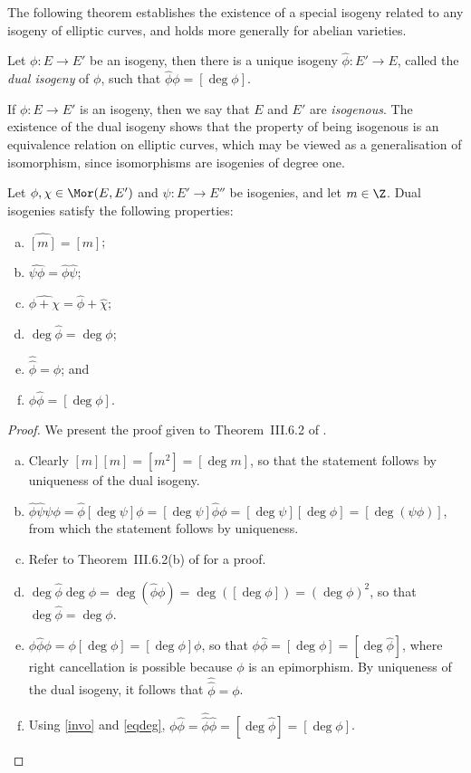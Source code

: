 The following theorem establishes the existence of a special isogeny related to any isogeny of elliptic curves, and holds more generally for abelian varieties.

\begin{thm}{}{}
Let $\phi : E \to E'$ be an isogeny, then there is a unique isogeny $\hat{\phi} : E' \to E$, called the \emph{dual isogeny} of $\phi$, such that $\hat{\phi} \phi = [\deg \phi]$.
\end{thm}

If $\phi : E \to E'$ is an isogeny, then we say that $E$ and $E'$ are \emph{isogenous}. The existence of the dual isogeny shows that the property of being isogenous is an equivalence relation on elliptic curves, which may be viewed as a generalisation of isomorphism, since isomorphisms are isogenies of degree one.

\begin{thm}{}{}
Let $\phi, \chi \in \Mor(E, E')$ and $\psi : E' \to E''$ be isogenies, and let $m \in \Z$. Dual isogenies satisfy the following properties:
\begin{enumerate}[(a)]
\item $\widehat{[m]} = [m]$;
\item $\widehat{\psi \phi} = \hat{\phi} \hat{\psi}$;
\item $\widehat{\phi + \chi} = \hat{\phi} + \hat{\chi}$;
\item \label{eqdeg} $\deg \hat{\phi} = \deg \phi$;
\item \label{invo} $\hat{\hat{\phi}} = \phi$; and
\item $\phi \hat{\phi} = [\deg \phi]$.
\end{enumerate}
\end{thm}
\begin{proof}
We present the proof given to Theorem~III.6.2 of \citep{Silverman}.
\begin{enumerate}[(a)]
\item Clearly $[m][m] = [m^2] = [\deg m]$, so that the statement follows by uniqueness of the dual isogeny.
\item $\hat{\phi} \hat{\psi} \psi \phi = \hat{\phi} [\deg \psi] \phi = [\deg \psi] \hat{\phi} \phi = [\deg \psi] [\deg \phi] = [\deg(\psi \phi)]$, from which the statement follows by uniqueness.
\item Refer to Theorem~III.6.2(b) of \citep{Silverman} for a proof. %
\item $\deg\hat{\phi} \deg\phi = \deg (\hat{\phi} \phi) = \deg([\deg \phi]) = (\deg \phi)^2$, so that $\deg\hat{\phi} = \deg\phi$.
\item $\phi \hat{\phi} \phi = \phi [\deg \phi] = [\deg \phi] \phi$, so that $\phi \hat{\phi} = [\deg \phi] = [\deg \hat{\phi}]$, where right cancellation is possible because $\phi$ is an epimorphism. By uniqueness of the dual isogeny, it follows that $\hat{\hat{\phi}} = \phi$.
\item Using \cref{invo} and \cref{eqdeg}, $\phi \hat{\phi} = \hat{\hat{\phi}} \hat{\phi} = [\deg \hat{\phi}] = [\deg \phi]$.
\end{enumerate}
\end{proof}

